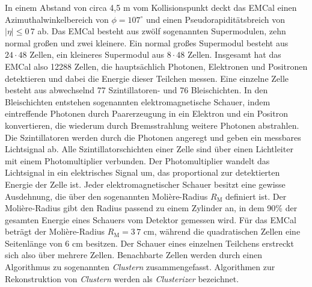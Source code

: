 In einem Abstand von circa 4,5 m vom Kollisionspunkt deckt das EMCal einen Azimuthalwinkelbereich von $\phi=107^{\circ}$ und einen Pseudorapidit\"atsbreich von $ |\eta| \leq 0\,7$ ab.
Das EMCal besteht aus zw\"olf sogenannten Supermodulen, zehn normal gro{\ss}en und zwei kleinere.
Ein normal gro{\ss}es Supermodul besteht aus $24\cdot48$ Zellen, ein kleineres Supermodul aus $8\cdot48$ Zellen.
Insgesamt hat das EMCal also 12288 Zellen, die haupts\"achlich Photonen, Elektronen und Positronen detektieren und dabei die Energie dieser Teilchen messen.
Eine einzelne Zelle besteht aus abwechselnd 77 Szintillatoren- und 76 Bleischichten.
In den Bleischichten entstehen sogenannten elektromagnetische Schauer, indem eintreffende Photonen durch Paarerzeugung in ein Elektron und ein Positron konvertieren, die wiederum durch Bremsstrahlung weitere Photonen abstrahlen.
Die Szintillatoren werden durch die Photonen angeregt und geben ein messbares Lichtsignal ab.
Alle Szintillatorschichten einer Zelle sind \"uber einen Lichtleiter mit einem Photomultiplier verbunden.
Der Photomultiplier wandelt das Lichtsignal in ein elektrisches Signal um, das proportional zur detektierten Energie der Zelle ist.
\newline
Jeder elektromagnetischer Schauer besitzt eine gewisse Ausdehnung, die \"uber den sogenannten Moli\`ere-Radius $R_{\text{M}}$ definiert ist.
Der Moli\`ere-Radius gibt den Radius passend zu einem Zylinder an, in dem 90\% der gesamten Energie eines Schauers vom Detektor gemessen wird.
F\"ur das EMCal betr\"agt der Moli\`ere-Radius $R_{\text{M}} = 3\,7$ cm, w\"ahrend die quadratischen Zellen eine Seitenl\"ange von 6 cm besitzen. 
Der Schauer eines einzelnen Teilchens erstreckt sich also \"uber mehrere Zellen.
Benachbarte Zellen werden durch einen Algorithmus zu sogenannten \textit{Clustern} zusammengefasst.
Algorithmen zur Rekonstruktion von \textit{Clustern} werden als \textit{Clusterizer} bezeichnet.
